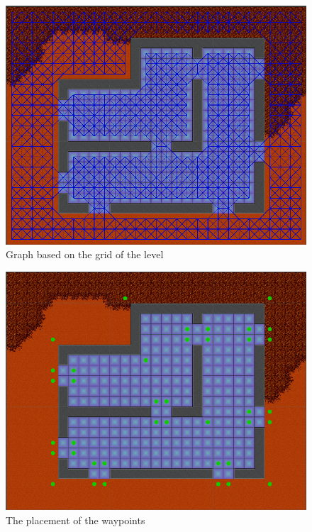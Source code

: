 
\begin{figure}
	\includegraphics[width=\textwidth]{figures/astar/gridGraph}
	\caption{Graph based on the grid of the level}
	\label{gridGraph}
\end{figure}

\begin{figure}
	\includegraphics[width=\textwidth]{figures/astar/waypoints}
	\caption{The placement of the waypoints}
	\label{waypointsNode}
\end{figure}

